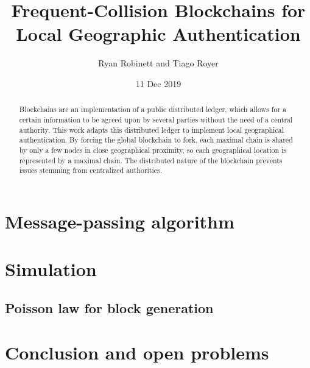 \documentclass{article}
\begin{document}
\title{Frequent-Collision Blockchains for Local Geographic Authentication}
\author{Ryan Robinett and Tiago Royer}
\date{11 Dec 2019}
\maketitle

\begin{abstract}
	Blockchains are an implementation of a public distributed ledger,
	which allows for a certain information to be agreed upon by several parties
	without the need of a central authority.
	This work adapts this distributed ledger
	to implement local geographical authentication.
	By forcing the global blockchain to fork,
	each maximal chain is shared by only a few nodes in close geographical proximity,
	so each geographical location is represented by a maximal chain.
	The distributed nature of the blockchain
	prevents issues stemming from centralized authorities.
\end{abstract}





\section{Message-passing algorithm}

\section{Simulation}
\subsection{Poisson law for block generation}





\section{Conclusion and open problems}



\end{document}
